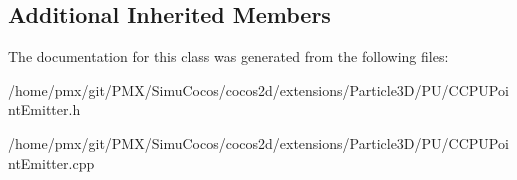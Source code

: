 \subsection*{Additional Inherited Members}


The documentation for this class was generated from the following files\+:\begin{DoxyCompactItemize}
\item 
/home/pmx/git/\+P\+M\+X/\+Simu\+Cocos/cocos2d/extensions/\+Particle3\+D/\+P\+U/C\+C\+P\+U\+Point\+Emitter.\+h\item 
/home/pmx/git/\+P\+M\+X/\+Simu\+Cocos/cocos2d/extensions/\+Particle3\+D/\+P\+U/C\+C\+P\+U\+Point\+Emitter.\+cpp\end{DoxyCompactItemize}
